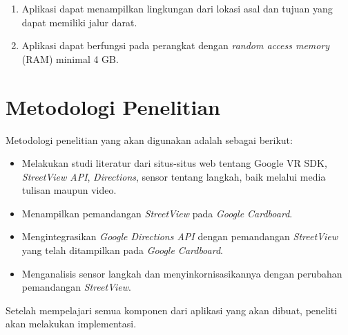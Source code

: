 \begin{enumerate}
	\item Aplikasi dapat menampilkan lingkungan dari lokasi asal dan tujuan yang dapat memiliki jalur darat. 
	
	\item Aplikasi dapat berfungsi pada perangkat dengan \textit{random access memory} (RAM) minimal 4 GB.

\end{enumerate}


\section{Metodologi Penelitian}
\label{sec:metlit}
Metodologi penelitian yang akan digunakan adalah sebagai berikut:
\begin{itemize}
	\item Melakukan studi literatur dari situs-situs web tentang Google VR SDK, \textit{StreetView API}, \textit{Directions}, sensor tentang langkah, baik melalui media tulisan maupun video.
	\item Menampilkan pemandangan {\it StreetView} pada {\it Google Cardboard}.
	\item Mengintegrasikan {\it Google Directions API} dengan pemandangan {\it StreetView} yang telah ditampilkan pada {\it Google Cardboard}.
	\item Menganalisis sensor langkah dan menyinkornisasikannya dengan perubahan pemandangan \textit{StreetView}.
\end{itemize}

Setelah mempelajari semua komponen dari aplikasi yang akan dibuat, peneliti akan melakukan implementasi. 

